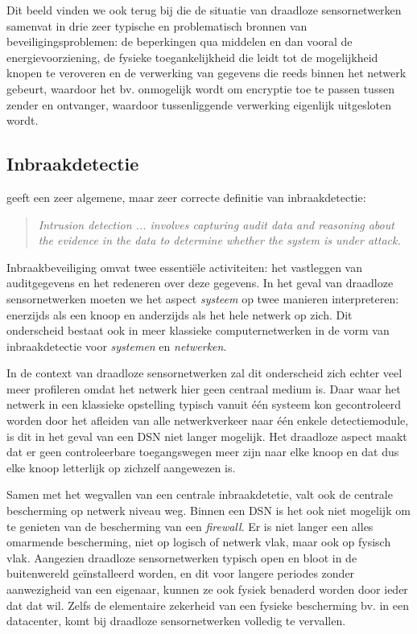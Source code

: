 Dit beeld vinden we ook terug bij \citep{aschenbruck2012security} die de
situatie van draadloze sensornetwerken samenvat in drie zeer typische en
problematisch bronnen van beveiligingsproblemen: de beperkingen qua middelen en
dan vooral de energievoorziening, de fysieke toegankelijkheid die leidt tot de
mogelijkheid knopen te veroveren en de verwerking van gegevens die reeds binnen
het netwerk gebeurt, waardoor het bv. onmogelijk wordt om encryptie toe te
passen tussen zender en ontvanger, waardoor tussenliggende verwerking eigenlijk
uitgesloten wordt.

\subsection{Inbraakdetectie}

\citep{zhang2000intrusion} geeft een zeer algemene, maar zeer correcte
definitie van inbraakdetectie:

\begin{quote}
\emph{Intrusion detection ... involves capturing audit data and reasoning about
the evidence in the data to determine whether the system is under attack.}
\end{quote}

Inbraakbeveiliging omvat twee essenti\"ele activiteiten: het vastleggen van
auditgegevens en het redeneren over deze gegevens. In het geval van draadloze
sensornetwerken moeten we het aspect \emph{systeem} op twee manieren
interpreteren: enerzijds als een knoop en anderzijds als het hele netwerk op
zich. Dit onderscheid bestaat ook in meer klassieke computernetwerken in de
vorm van inbraakdetectie voor \emph{systemen} en \emph{netwerken}.

In de context van draadloze sensornetwerken zal dit onderscheid zich echter
veel meer profileren omdat het netwerk hier geen centraal medium is. Daar waar
het netwerk in een klassieke opstelling typisch vanuit \'e\'en systeem kon
gecontroleerd worden door het afleiden van alle netwerkverkeer naar \'e\'en
enkele detectiemodule, is dit in het geval van een DSN niet langer mogelijk.
Het draadloze aspect maakt dat er geen controleerbare toegangswegen meer zijn
naar elke knoop en dat dus elke knoop letterlijk op zichzelf aangewezen is.

Samen met het wegvallen van een centrale inbraakdetetie, valt ook de centrale
bescherming op netwerk niveau weg. Binnen een DSN is het ook niet mogelijk om
te genieten van de bescherming van een \emph{firewall}. Er is niet langer een
alles omarmende bescherming, niet op logisch of netwerk vlak, maar ook op
fysisch vlak. Aangezien draadloze sensornetwerken typisch open en bloot in de
buitenwereld ge\"installeerd worden, en dit voor langere periodes zonder
aanwezigheid van een eigenaar, kunnen ze ook fysiek benaderd worden door ieder
dat dat wil. Zelfs de elementaire zekerheid van een fysieke bescherming bv. in
een datacenter, komt bij draadloze sensornetwerken volledig te vervallen.

